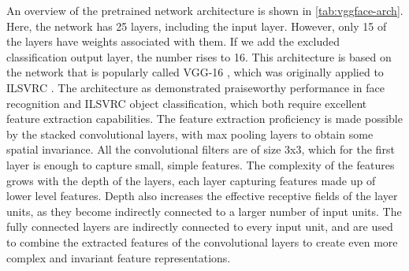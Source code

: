 \noindent An overview of the pretrained network architecture is shown in \autoref{tab:vggface-arch}. Here, the network has 25 layers, including the input layer. However, only 15 of the layers have weights associated with them. If we add the excluded classification output layer, the number rises to 16. This architecture is based on the network that is popularly called VGG-16 \cite{vgg}, which was originally applied to ILSVRC \cite{imagenet}. The architecture as demonstrated praiseworthy performance in face recognition and ILSVRC object classification, which both require excellent feature extraction capabilities. The feature extraction proficiency is made possible by the stacked convolutional layers, with max pooling layers to obtain some spatial invariance. All the convolutional filters are of size 3x3, which for the first layer is enough to capture small, simple features. The complexity of the features grows with the depth of the layers, each layer capturing features made up of lower level features. Depth also increases the effective receptive fields of the layer units, as they become indirectly connected to a larger number of input units. The fully connected layers are indirectly connected to every input unit, and are used to combine the extracted features of the convolutional layers to create even more complex and invariant feature representations. \\



